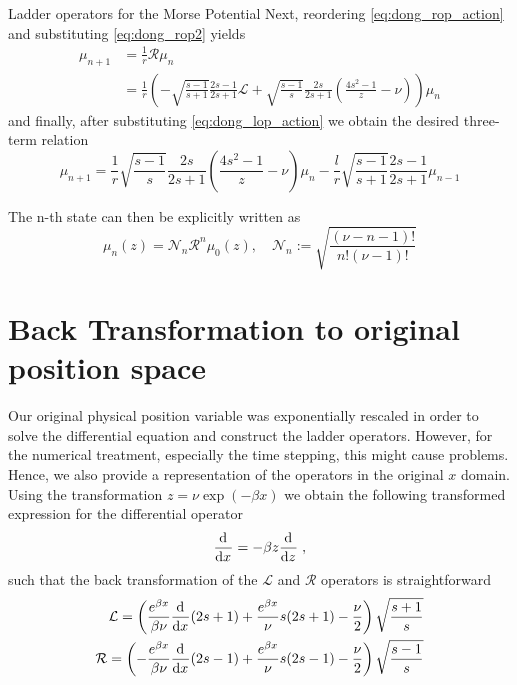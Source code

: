 \begin{chapter}{Ladder operators for the Morse Potential}
Next, reordering \eqref{eq:dong_rop_action} and substituting \eqref{eq:dong_rop2} yields
\begin{align}
    \mu_{n+1} &= \frac{1}{r}\mathcal{R}\mu_n\\
    &=\frac{1}{r}\left(-\sqrt{\frac{s-1}{s+1}}\frac{2s-1}{2s+1}\mathcal{L}
	+\sqrt{\frac{s-1}{s}}\frac{2s}{2s+1}\left(\frac{4s^2-1}{z}-\nu\right)\right)\mu_n
\end{align}
and finally, after substituting \eqref{eq:dong_lop_action} we obtain the desired three-term relation
\begin{equation}
    \mu_{n+1}=\frac{1}{r}\sqrt{\frac{s-1}{s}}\frac{2s}{2s+1}\left(\frac{4s^2-1}{z}-\nu\right)\mu_n
    -\frac{l}{r}\sqrt{\frac{s-1}{s+1}}\frac{2s-1}{2s+1}\mu_{n-1}
\end{equation}

The n-th state can then be explicitly written as
\begin{equation}
\mu_n(z)=\mathcal{N}_n\mathcal{R}^n\mu_0(z),\quad \mathcal{N}_n:=\sqrt{\frac{(\nu-n-1)!}{n!(\nu-1)!}}
\end{equation}


\section{Back Transformation to original position space} %
\label{sec:Back_transf}
Our original physical position variable was exponentially rescaled in order to solve the differential equation and construct the ladder operators.
However, for the numerical treatment, especially the time stepping, this might cause problems.
Hence, we also provide a representation of the operators in the original $x$ domain.\\

Using the transformation $z=\nu\exp{(-\beta x)}$ we obtain the following transformed expression for the differential operator
\begin{equation}
    \label{eq:ddy}
    \frac{\mathrm{d}^{}}{\mathrm{d}x^{}}=-\beta z\frac{\mathrm{d}^{}}{\mathrm{d}z^{}}\;,
\end{equation}
such that the back transformation of the $\mathcal{L}$ and $\mathcal{R}$ operators is straightforward
\begin{align}
    \label{eq:dong_lrop_x}
    \begin{split}
    \mathcal{L}=\left(\frac{e^{\beta x}}{\beta\nu}\frac{\mathrm{d}^{}}{\mathrm{d}x^{}}(2s+1)+\frac{e^{\beta x}}{\nu}s(2s+1)-\frac{\nu}{2} \right)\sqrt{\frac{s+1}{s}}\\
    \mathcal{R}=\left(-\frac{e^{\beta x}}{\beta\nu}\frac{\mathrm{d}^{}}{\mathrm{d}x^{}}(2s-1)+\frac{e^{\beta x}}{\nu}s(2s-1)-\frac{\nu}{2} \right)\sqrt{\frac{s-1}{s}}
    \end{split}
\end{align}



\end{chapter}
